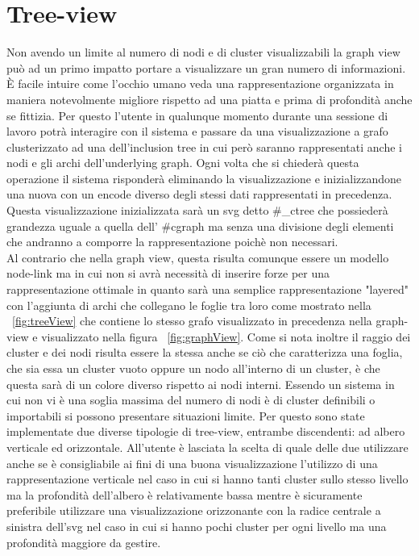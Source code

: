 {\section{Tree-view}
Non avendo un limite al numero di nodi e di cluster visualizzabili la graph view può ad un primo impatto portare a visualizzare un gran numero di informazioni. È facile intuire come l'occhio umano veda una rappresentazione organizzata in maniera notevolmente migliore rispetto ad una piatta e prima di profondità anche se fittizia. Per questo l'utente in qualunque momento durante una sessione di lavoro potrà interagire con il sistema e passare da una visualizzazione a grafo clusterizzato ad una dell'inclusion tree in cui però saranno rappresentati anche i nodi e gli archi dell'underlying graph.
Ogni volta che si chiederà questa operazione il sistema risponderà eliminando la visualizzazione e inizializzandone una nuova con un encode diverso degli stessi dati rappresentati in precedenza. Questa visualizzazione inizializzata sarà un svg detto \#\_ctree che possiederà grandezza uguale a quella dell' \#cgraph ma senza una divisione degli elementi che andranno a comporre la rappresentazione poichè non necessari.\\
Al contrario che nella graph view, questa risulta comunque essere un modello node-link ma in cui non si avrà necessità di inserire forze per una rappresentazione ottimale in quanto sarà una semplice rappresentazione "layered" con l'aggiunta di archi che collegano le foglie tra loro come mostrato nella \figurename~\ref{fig:treeView} che contiene lo stesso grafo visualizzato in precedenza nella graph-view e visualizzato nella figura \figurename~\ref{fig:graphView}.
Come si nota inoltre il raggio dei cluster e dei nodi risulta essere la stessa anche se ciò che caratterizza una foglia, che sia essa un cluster vuoto oppure un nodo all'interno di un cluster, è che questa sarà di un colore diverso rispetto ai nodi interni.
Essendo un sistema in cui non vi è una soglia massima del numero di nodi è di cluster definibili o importabili si possono presentare situazioni limite. Per questo sono state implementate due diverse tipologie di tree-view, entrambe discendenti: ad albero verticale ed orizzontale.
All'utente è lasciata la scelta di quale delle due utilizzare anche se è consigliabile ai fini di una buona visualizzazione l'utilizzo di una rappresentazione verticale nel caso in cui si hanno tanti cluster sullo stesso livello ma la profondità dell'albero è relativamente bassa mentre è sicuramente preferibile utilizzare una visualizzazione orizzonante con la radice centrale a sinistra dell'svg nel caso in cui si hanno pochi cluster per ogni livello ma una profondità maggiore da gestire.
}
